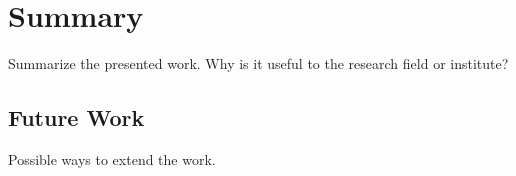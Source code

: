 \chapter{Summary}
\label{s:Summary}

Summarize the presented work. Why is it useful to the research field or institute?


\section{Future Work}
\label{ss:FutureWork}

Possible ways to extend the work.


